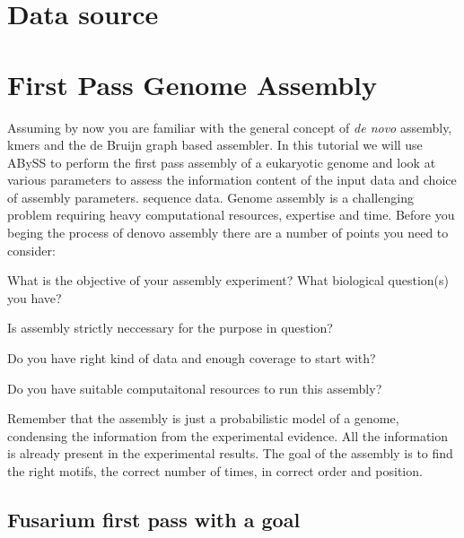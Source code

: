 \section{Data source}

\newpage

\section{First Pass Genome Assembly}
\begin{information}
Assuming by now you are familiar with the general concept of \textit{de novo} assembly, kmers and the de Bruijn graph based assembler. In this tutorial we will use ABySS to perform  the first pass assembly of a eukaryotic genome and look at various parameters to assess the information content of the input data and choice of assembly parameters. 
sequence data. 
Genome assembly is a challenging problem requiring heavy computational resources, expertise and time. Before you beging the process of denovo assembly there are a number of points you need to consider:
\item What is the objective of your assembly experiment? What biological question(s) you have?
\item Is assembly strictly neccessary for the purpose in question?
\item Do you have right kind of data and enough coverage to start with?
\item Do you have suitable computaitonal resources to run this assembly?

\end{information}

\begin{note}
Remember that the assembly is just a probabilistic model of a genome, condensing the information 
from the experimental evidence.  All the information is already present in the 
experimental results. The goal of the assembly is to find the right motifs, 
the correct number of times, in correct order and position.
\end{note}


\subsection{Fusarium first pass with a goal}

